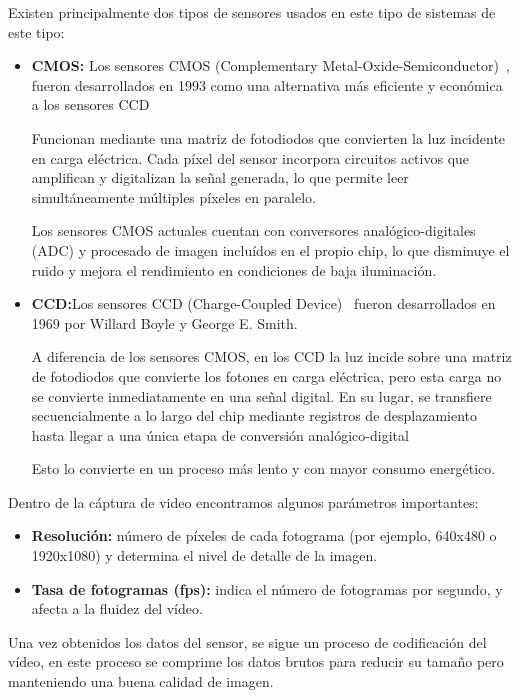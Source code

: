 Existen principalmente dos tipos de sensores usados en este tipo de sistemas de este tipo:
\begin{itemize}
    \item \textbf{CMOS:} Los sensores CMOS (Complementary Metal-Oxide-Semiconductor)~\citep{cmos}, fueron desarrollados en 1993 como una alternativa más eficiente y económica a los sensores CCD

    Funcionan mediante una matriz de fotodiodos que convierten la luz incidente en carga eléctrica.
    Cada píxel del sensor incorpora circuitos activos que amplifican y digitalizan la señal generada, lo que permite leer simultáneamente múltiples píxeles en paralelo.

    Los sensores CMOS actuales cuentan con conversores analógico-digitales (ADC) y procesado de imagen incluídos en el propio chip, lo que disminuye el ruido y mejora el rendimiento en condiciones de baja iluminación.
    \item \textbf{CCD:}Los sensores CCD (Charge-Coupled Device)~\citep{blanc2001ccd} fueron desarrollados en 1969 por Willard Boyle y George E. Smith.

    A diferencia de los sensores CMOS, en los CCD la luz incide sobre una matriz de fotodiodos que convierte los fotones en carga eléctrica, pero esta carga no se convierte inmediatamente en una señal digital.
    En su lugar, se transfiere secuencialmente a lo largo del chip mediante registros de desplazamiento hasta llegar a una única etapa de conversión analógico-digital

    Esto lo convierte en un proceso más lento y con mayor consumo energético.
\end{itemize}
Dentro de la cáptura de video encontramos algunos parámetros importantes:
\begin{itemize}
    \item \textbf{Resolución:} número de píxeles de cada fotograma (por ejemplo, 640x480 o 1920x1080) y determina el nivel de detalle de la imagen.
    \item \textbf{Tasa de fotogramas (fps):} indica el número de fotogramas por segundo, y afecta a la fluidez del vídeo.
\end{itemize}

Una vez obtenidos los datos del sensor, se sigue un proceso de codificación del vídeo, en este proceso se comprime los datos brutos para reducir su tamaño pero manteniendo una buena calidad de imagen.

